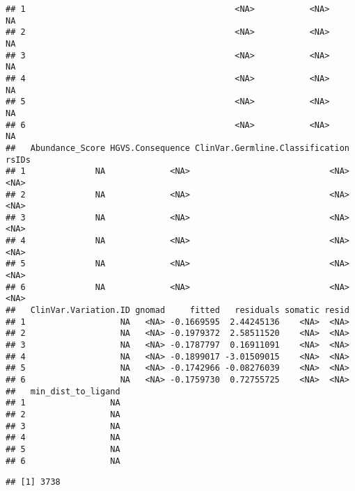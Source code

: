 \documentclass[
]{article}
\newenvironment{Shaded}{\begin{snugshade}}{\end{snugshade}}
\newcommand{\CommentTok}[1]{\textcolor[rgb]{0.56,0.35,0.01}{\textit{#1}}}
\newcommand{\FunctionTok}[1]{\textcolor[rgb]{0.13,0.29,0.53}{\textbf{#1}}}
\newcommand{\NormalTok}[1]{#1}
\newcommand{\OtherTok}[1]{\textcolor[rgb]{0.56,0.35,0.01}{#1}}
\newcommand{\SpecialCharTok}[1]{\textcolor[rgb]{0.81,0.36,0.00}{\textbf{#1}}}
\begin{document}
\begin{verbatim}
## 1                                          <NA>           <NA>            NA
## 2                                          <NA>           <NA>            NA
## 3                                          <NA>           <NA>            NA
## 4                                          <NA>           <NA>            NA
## 5                                          <NA>           <NA>            NA
## 6                                          <NA>           <NA>            NA
##   Abundance_Score HGVS.Consequence ClinVar.Germline.Classification rsIDs
## 1              NA             <NA>                            <NA>  <NA>
## 2              NA             <NA>                            <NA>  <NA>
## 3              NA             <NA>                            <NA>  <NA>
## 4              NA             <NA>                            <NA>  <NA>
## 5              NA             <NA>                            <NA>  <NA>
## 6              NA             <NA>                            <NA>  <NA>
##   ClinVar.Variation.ID gnomad     fitted   residuals somatic resid
## 1                   NA   <NA> -0.1669595  2.44245136    <NA>  <NA>
## 2                   NA   <NA> -0.1979372  2.58511520    <NA>  <NA>
## 3                   NA   <NA> -0.1787797  0.16911091    <NA>  <NA>
## 4                   NA   <NA> -0.1899017 -3.01509015    <NA>  <NA>
## 5                   NA   <NA> -0.1742966 -0.08276039    <NA>  <NA>
## 6                   NA   <NA> -0.1759730  0.72755725    <NA>  <NA>
##   min_dist_to_ligand
## 1                 NA
## 2                 NA
## 3                 NA
## 4                 NA
## 5                 NA
## 6                 NA
\end{verbatim}

\begin{Shaded}
\end{Shaded}

\begin{verbatim}
## [1] 3738
\end{verbatim}

\begin{Shaded}
\end{Shaded}
\end{document}
